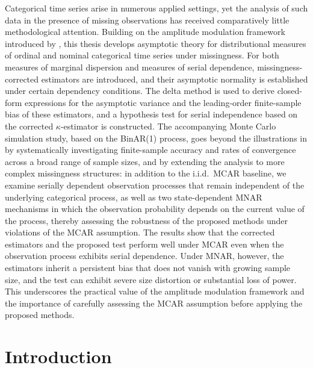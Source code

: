 ﻿\documentclass[12pt,a4paper]{scrreprt}
\theoremstyle{definition}
\begin{document}
Categorical time series arise in numerous applied settings, yet the analysis of such
data in the presence of missing observations has received comparatively little
methodological attention. Building on the amplitude modulation framework introduced
by \citet{weiss2021categorical}, this thesis develops asymptotic theory for distributional
measures of ordinal and nominal categorical time series under missingness. For both
measures of marginal dispersion and measures of serial dependence, 
missingness-corrected estimators are introduced, and their asymptotic normality is established 
under certain dependency conditions. The delta method is used to derive closed-form expressions for the
asymptotic variance and the leading-order finite-sample bias of these estimators, and
a hypothesis test for serial independence based on the corrected $\kappa$-estimator is
constructed. The accompanying Monte Carlo simulation study, based on the BinAR(1) process,
goes beyond the illustrations in \citet{weiss2021categorical} by systematically
investigating finite-sample accuracy and rates of convergence across a broad range
of sample sizes, and by extending the analysis to more complex missingness structures:
in addition to the i.i.d.\ MCAR baseline, we examine serially dependent observation
processes that remain independent of the underlying categorical process, as well as
two state-dependent MNAR mechanisms in which the observation probability depends on
the current value of the process, thereby assessing the robustness of the proposed
methods under violations of the MCAR assumption. The results show that the corrected 
estimators and the proposed test perform well 
under MCAR even when the observation process exhibits serial dependence. Under MNAR, 
however, the estimators inherit a persistent bias that does not vanish with growing 
sample size, and the test can exhibit severe size distortion or substantial loss of 
power. This underscores the practical value of the amplitude modulation framework and 
the importance of carefully assessing the MCAR assumption before applying the 
proposed methods.

\chapter*{Introduction}
\end{document}
